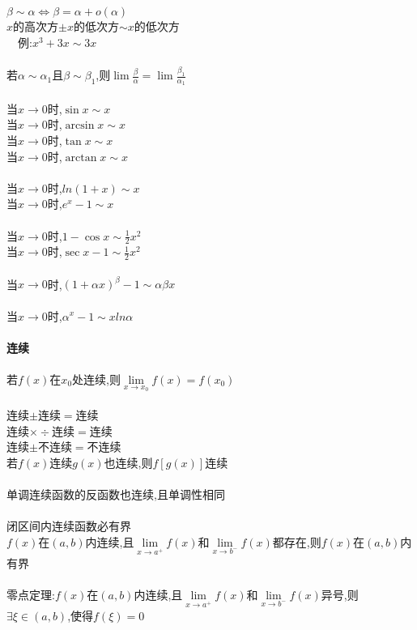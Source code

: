 \documentclass{article}
\begin{document}
\begin{flushleft}
	$\beta \sim \alpha \Leftrightarrow \beta = \alpha + o(\alpha)$\\
	$x$的高次方$\pm x$的低次方$\sim x$的低次方\\
	\ \ 例:$x^3+3x\sim 3x$\\
	~\\
	若$\alpha \sim \alpha_1$且$\beta \sim \beta_1$,则$\lim \frac{\beta}{\alpha} = \lim \frac{\beta_1}{\alpha_1}$\\
	~\\
	当$x\to 0$时,$\sin x \sim x$\\
	当$x\to 0$时,$\arcsin x \sim x$\\
	当$x\to 0$时,$\tan x \sim x$\\
	当$x\to 0$时,$\arctan x \sim x$\\
	~\\
	当$x\to 0$时,$ln(1+x) \sim x$\\
	当$x\to 0$时,$e^x-1 \sim x$\\
	~\\
	当$x\to 0$时,$1-\cos x \sim \frac{1}{2} x^2$\\
	当$x\to 0$时,$\sec x - 1 \sim \frac{1}{2} x^2$\\
	~\\
	当$x\to 0$时,$(1+\alpha x)^\beta -1 \sim \alpha\beta x$\\
	~\\
	当$x\to 0$时,$\alpha^x -1 \sim xln\alpha$\\
	
	~\\ \textbf{连续}\\~\\
	
	若$f(x)$在$x_0$处连续,则$\lim\limits_{x\to x_0} f(x)=f(x_0)$\\
	~\\
	连续$\pm$连续$=$连续\\
	连续$\times \div$连续$=$连续\\
	连续$\pm$不连续$=$不连续\\
	若$f(x)$连续$g(x)$也连续,则$f[g(x)]$连续\\
	~\\
	单调连续函数的反函数也连续,且单调性相同\\
	~\\
	闭区间内连续函数必有界\\
	$f(x)$在$(a,b)$内连续,且$\lim\limits_{x\to a^+} f(x)$和$\lim\limits_{x\to b^-} f(x)$都存在,则$f(x)$在$(a,b)$内有界\\
	~\\
	零点定理:$f(x)$在$(a,b)$内连续,且$\lim\limits_{x\to a^+} f(x)$和$\lim\limits_{x\to b^-} f(x)$异号,则$\exists \xi \in (a,b)$,使得$f(\xi)=0$\\
	

\end{flushleft}
\end{document}
